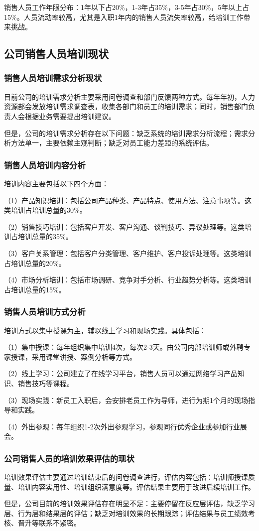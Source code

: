 销售人员工作年限分布：1年以下占20\%，1-3年占35\%，3-5年占30\%，5年以上占15\%。人员流动率较高，尤其是入职1年内的销售人员流失率较高，给培训工作带来挑战。

\subsection{公司销售人员培训现状}

\subsubsection{销售人员培训需求分析现状}

目前公司的培训需求分析主要采用问卷调查和部门反馈两种方式。每年年初，人力资源部会发放培训需求调查表，收集各部门和员工的培训需求；同时，销售部门负责人会根据业务需要提出培训建议。

但是，公司的培训需求分析存在以下问题：缺乏系统的培训需求分析流程；需求分析方法单一，主要依赖主观判断；缺乏对员工能力差距的系统评估。

\subsubsection{销售人员培训内容分析}

培训内容主要包括以下四个方面：

（1）产品知识培训：包括公司产品种类、产品特点、使用方法、注意事项等。这类培训占培训总量的30\%。

（2）销售技巧培训：包括客户开发、客户沟通、谈判技巧、异议处理等。这类培训占培训总量的35\%。

（3）客户关系管理：包括客户分类管理、客户维护、客户投诉处理等。这类培训占培训总量的20\%。

（4）市场分析培训：包括市场调研、竞争对手分析、行业趋势分析等。这类培训占培训总量的15\%。

\subsubsection{销售人员培训方式分析}

培训方式以集中授课为主，辅以线上学习和现场实践。具体包括：

（1）集中授课：每年组织集中培训4次，每次2-3天。由公司内部培训师或外聘专家授课，采用课堂讲授、案例分析等方式。

（2）线上学习：公司建立了在线学习平台，销售人员可以通过网络学习产品知识、销售技巧等课程。

（3）现场实践：新员工入职后，会安排老员工作为导师，进行为期1个月的现场指导和实践。

（4）外出参观：每年组织1-2次外出参观学习，参观同行优秀企业或参加行业展会。

\subsubsection{公司销售人员的培训效果评估的现状}

培训效果评估主要通过培训结束后的问卷调查进行，评估内容包括：培训师授课质量、培训内容实用性、培训组织满意度等。评估结果主要用于改进后续培训工作。

但是，公司目前的培训效果评估存在明显不足：主要停留在反应层评估，缺乏学习层、行为层和结果层的评估；缺乏对培训效果的长期跟踪；评估结果与员工绩效考核、晋升等联系不紧密。
